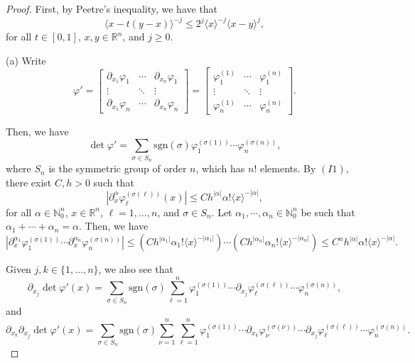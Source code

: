 \documentclass[11pt,reqno]{amsart}
\numberwithin{equation}{section}
\begin{document}
\begin{proof}
	First, by Peetre's inequality, we have that
	\begin{equation}\label{peetre}
		\langle x-t(y-x)\rangle^{-j} \leq 2^j\langle x\rangle^{-j}\langle x-y\rangle^{j},
	\end{equation}
	for all $t\in[0,1]$, $x,y\in\mathbb{R}^n$, and $j\geq 0$.
	
	\medskip\noindent
	(a) Write
	\[\varphi' = \begin{bmatrix} \partial_{x_1}\varphi_1 & \cdots & \partial_{x_n}\varphi_1 \\ \vdots & \ddots & \vdots \\ \partial_{x_1}\varphi_n & \cdots & \partial_{x_n}\varphi_n \end{bmatrix} = \begin{bmatrix} \varphi_1^{(1)} & \cdots & \varphi_1^{(n)} \\ \vdots & \ddots & \vdots \\ \varphi_n^{(1)} & \cdots & \varphi_n^{(n)} \end{bmatrix}.\]
	
	Then, we have
	\[\det\varphi' = \sum_{\sigma\in S_n}\mathrm{sgn}(\sigma)\varphi_1^{(\sigma(1))}\cdots\varphi_n^{(\sigma(n))},\]
	where $S_n$ is the symmetric group of order $n$, which has $n!$ elements. By $(I1)$, there exist $C,h>0$ such that
	\[|\partial_x^\alpha\varphi_\ell^{(\sigma(\ell))}(x)|\leq Ch^{|\alpha|}\alpha!\langle x\rangle^{-|\alpha|},\]
	for all $\alpha\in\mathbb{N}_0^n$, $x\in\mathbb{R}^n$, $\ell=1,\dots,n$, and $\sigma\in S_n$. Let $\alpha_1,\cdots,\alpha_n\in\mathbb{N}_0^n$ be such that $\alpha_1+\cdots+\alpha_n=\alpha$. Then, we have
	\begin{equation*}
		|\partial_x^{\alpha_1}\varphi_1^{(\sigma(1))}\cdots \partial_x^{\alpha_n}\varphi_n^{(\sigma(n))}| \leq (Ch^{|\alpha_1|}\alpha_1!\langle x\rangle^{-|\alpha_1|})\cdots (Ch^{|\alpha_n|}\alpha_n!\langle x\rangle^{-|\alpha_n|}) \leq C^nh^{|\alpha|}\alpha!\langle x\rangle^{-|\alpha|}.
	\end{equation*}
	
	Given $j,k\in\{1,\dots,n\}$, we also see that
	\[\partial_{x_j}\det\varphi'(x) = 
	\sum_{\sigma\in S_n}\mathrm{sgn}(\sigma)\sum_{\ell=1}^n \varphi_1^{(\sigma(1))}\cdots \partial_{x_j}\varphi_{\ell}^{(\sigma(\ell))}\cdots \varphi_n^{(\sigma(n))},\]
	and
	\[\partial_{x_k}\partial_{x_j}\det\varphi'(x) = \sum_{\sigma\in S_n}\mathrm{sgn}(\sigma)\sum_{\nu=1}^n \sum_{\ell=1}^n \varphi_1^{(\sigma(1))}\cdots \partial_{x_k}\varphi_{\nu}^{(\sigma(\nu))} \cdots \partial_{x_j}\varphi_{\ell}^{(\sigma(\ell))}\cdots \varphi_n^{(\sigma(n))}.\]
	

\end{proof}
\end{document}
